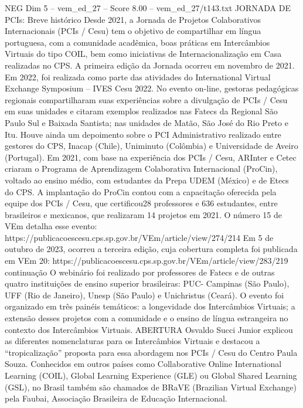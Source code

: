 \begin{textsample}{NEG Dim 5 – vem\_ed\_27 – Score 8.00 – vem\_ed\_27/t143.txt}  \label{ex:f5_neg_136}
JORNADA DE PCIs: Breve histórico Desde 2021, a Jornada de Projetos Colaborativos Internacionais (PCIs / Cesu) tem o objetivo de compartilhar em língua portuguesa, com a comunidade acadêmica, boas práticas em Intercâmbios Virtuais do tipo COIL, bem como iniciativas de Internacionalização em Casa realizadas no CPS.
A primeira edição da Jornada ocorreu em novembro de 2021.
Em 2022, foi realizada como parte das atividades do International Virtual Exchange Symposium – IVES Cesu 2022.
No evento on-line, gestoras pedagógicas regionais compartilharam suas experiências sobre a divulgação de PCIs / Cesu em suas unidades e citaram exemplos realizados nas Fatecs da Regional São Paulo Sul e Baixada Santista; nas unidades de Matão, São José do Rio Preto e Itu.
Houve ainda um depoimento sobre o PCI Administrativo realizado entre gestores do CPS, Inacap (Chile), Uniminuto (Colômbia) e Universidade de Aveiro (Portugal).
Em 2021, com base na experiência dos PCIs / Cesu, ARInter e Cetec criaram o Programa de Aprendizagem Colaborativa Internacional (ProCin), voltado ao ensino médio, com estudantes da Prepa UDEM (México) e de Etecs do CPS.
A implantação do ProCin contou com a capacitação oferecida pela equipe dos PCIs / Cesu, que certificou28 professores e 636 estudantes, entre brasileiros e mexicanos, que realizaram 14 projetos em 2021.
O número 15 de VEm detalha esse evento: https://publicacoescesu.cps.sp.gov.br/VEm/article/view/274/214 Em 5 de outubro de 2023, ocorreu a terceira edição, cuja cobertura completa foi publicada em VEm 20: https://publicacoescesu.cps.sp.gov.br/VEm/article/view/283/219 continuação O webinário foi realizado por professores de Fatecs e de outras quatro instituições de ensino superior brasileiras: PUC- Campinas (São Paulo), UFF (Rio de Janeiro), Unesp (São Paulo) e Unichristus (Ceará).
O evento foi organizado em três painéis temáticos: a longevidade dos Intercâmbios Virtuais; a extensão desses projetos com a comunidade e o ensino de língua estrangeira no contexto dos Intercâmbios Virtuais.
ABERTURA Osvaldo Succi Junior explicou as diferentes nomenclaturas para os Intercâmbios Virtuais e destacou a “tropicalização” proposta para essa abordagem nos PCIs / Cesu do Centro Paula Souza.
Conhecidos em outros países como Collaborative Online International Learning (COIL), Global Learning Experience (GLE) ou Global Shared Learning (GSL), no Brasil também são chamados de BRaVE (Brazilian Virtual Exchange) pela Faubai, Associação Brasileira de Educação Internacional.

\end{textsample}
